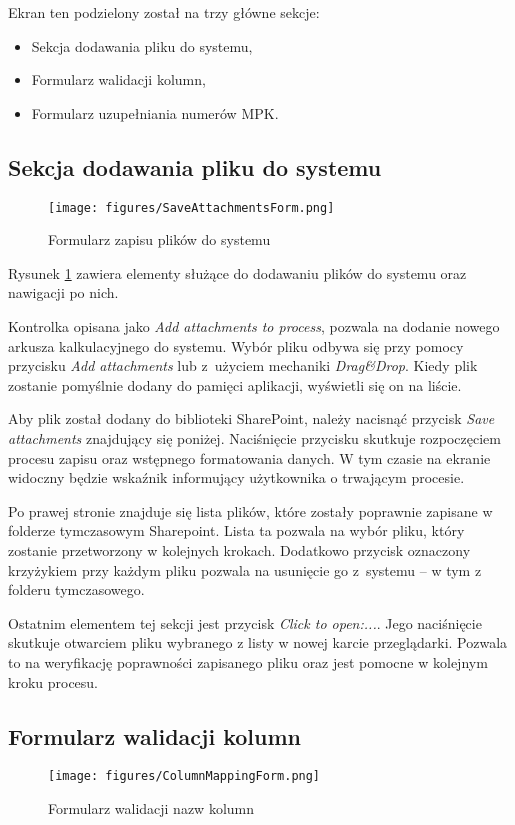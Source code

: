 Ekran ten podzielony został na trzy główne sekcje:
\begin{itemize}
    \item Sekcja dodawania pliku do systemu,
    \item Formularz walidacji kolumn,
    \item Formularz uzupełniania numerów MPK.
\end{itemize}

\subsection*{Sekcja dodawania pliku do systemu}
\begin{figure}[H]
    \centering
    \texttt{[image: figures/SaveAttachmentsForm.png]}
    \caption{Formularz zapisu plików do systemu}
    \label{fig:SaveAttachmentsForm}
\end{figure}
Rysunek \ref{fig:SaveAttachmentsForm} zawiera elementy służące do dodawaniu plików do systemu oraz nawigacji po nich.

Kontrolka opisana jako \emph{Add attachments to process}, pozwala na dodanie nowego arkusza kalkulacyjnego do systemu. Wybór pliku odbywa się przy pomocy przycisku \emph{Add attachments} lub z~użyciem mechaniki \emph{Drag\&Drop}. Kiedy plik zostanie pomyślnie dodany do pamięci aplikacji, wyświetli się on na liście.

Aby plik został dodany do biblioteki SharePoint, należy nacisnąć przycisk \emph{Save attachments} znajdujący się poniżej. Naciśnięcie przycisku skutkuje rozpoczęciem procesu zapisu oraz wstępnego formatowania danych. W tym czasie na ekranie widoczny będzie wskaźnik informujący użytkownika o trwającym procesie.

Po prawej stronie znajduje się lista plików, które zostały poprawnie zapisane w folderze tymczasowym Sharepoint. Lista ta pozwala na wybór pliku, który zostanie przetworzony w kolejnych krokach. Dodatkowo przycisk oznaczony krzyżykiem przy każdym pliku pozwala na usunięcie go z~systemu -- w tym z folderu tymczasowego.

Ostatnim elementem tej sekcji jest przycisk \emph{Click to open:...}.
Jego naciśnięcie skutkuje otwarciem pliku wybranego z listy w nowej karcie przeglądarki. Pozwala to na weryfikację poprawności zapisanego pliku oraz jest pomocne w kolejnym kroku procesu.

\subsection{Formularz walidacji kolumn}
\begin{figure}[h]
    \centering
    \texttt{[image: figures/ColumnMappingForm.png]}
    \caption{Formularz walidacji nazw kolumn}
    \label{fig:columnmappingform}
\end{figure}

